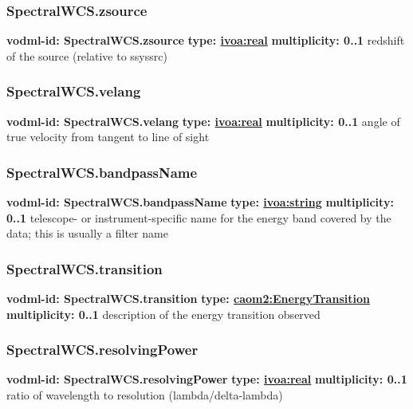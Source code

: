     \subsubsection{SpectralWCS.zsource}
      \textbf{vodml-id: SpectralWCS.zsource} \newline
      \textbf{type: \hyperref[sect:ivoa]{ivoa:real}} \newline
      \textbf{multiplicity: 0..1} \newline
      redshift of the source (relative to ssyssrc)

    \subsubsection{SpectralWCS.velang}
      \textbf{vodml-id: SpectralWCS.velang} \newline
      \textbf{type: \hyperref[sect:ivoa]{ivoa:real}} \newline
      \textbf{multiplicity: 0..1} \newline
      angle of true velocity from tangent to line of sight

    \subsubsection{SpectralWCS.bandpassName}
      \textbf{vodml-id: SpectralWCS.bandpassName} \newline
      \textbf{type: \hyperref[sect:ivoa]{ivoa:string}} \newline
      \textbf{multiplicity: 0..1} \newline
      telescope- or instrument-specific name for the energy band covered by the data; this is usually a filter name

    \subsubsection{SpectralWCS.transition}
      \textbf{vodml-id: SpectralWCS.transition} \newline
      \textbf{type: \hyperref[sect:EnergyTransition]{caom2:EnergyTransition}} \newline
      \textbf{multiplicity: 0..1} \newline
      description of the energy transition observed

    \subsubsection{SpectralWCS.resolvingPower}
      \textbf{vodml-id: SpectralWCS.resolvingPower} \newline
      \textbf{type: \hyperref[sect:ivoa]{ivoa:real}} \newline
      \textbf{multiplicity: 0..1} \newline
      ratio of wavelength to resolution (lambda/delta-lambda)


